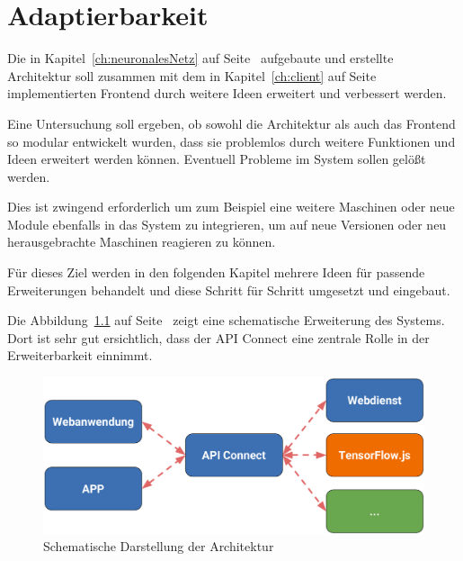 \chapter{Adaptierbarkeit}
\label{ch:adaptierbarkeit}
Die in Kapitel~\ref{ch:neuronalesNetz} auf Seite~\pageref{ch:neuronalesNetz} aufgebaute und erstellte Architektur soll
zusammen mit dem in Kapitel~\ref{ch:client} auf Seite~\pageref{ch:client} implementierten Frontend durch weitere Ideen
erweitert und verbessert werden.

Eine Untersuchung soll ergeben, ob sowohl die Architektur als auch das Frontend so modular entwickelt wurden, dass sie 
problemlos durch weitere Funktionen und Ideen erweitert werden können. Eventuell Probleme im System sollen gelößt werden.

Dies ist zwingend erforderlich um zum Beispiel eine weitere Maschinen oder neue Module ebenfalls in das System zu 
integrieren, um auf neue Versionen oder neu herausgebrachte Maschinen reagieren zu können.

Für dieses Ziel werden in den folgenden Kapitel mehrere Ideen für passende Erweiterungen behandelt und diese Schritt für 
Schritt umgesetzt und eingebaut.

Die Abbildung~\ref{fig:schematische_architektur_5} auf Seite~\pageref{fig:schematische_architektur_5} zeigt eine schematische 
Erweiterung des Systems. Dort ist sehr gut ersichtlich, dass der API Connect eine zentrale Rolle in der Erweiterbarkeit 
einnimmt.

\begin{figure}[h]
    \centering
    \includegraphics[width=\textwidth]{images/kapitel_5/architektur_schematisch.pdf}
    \caption{Schematische Darstellung der Architektur}
    \label{fig:schematische_architektur_5}
\end{figure}